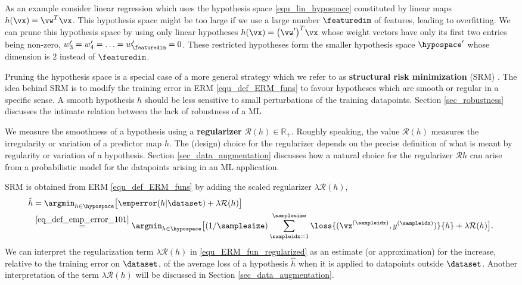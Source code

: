 \documentclass[12pt]{report}
\newcommand{\featurelen}{\featuredim}
\begin{document}
As an example consider linear regression which uses the hypothesis space \eqref{equ_lin_hypospace} 
constituted by linear maps $h(\vx) = \vw^{T} \vx$. This hypothesis space might be 
too large if we use a large number $\featurelen$ of features, leading to overfitting. 
We can prune this hypothesis space by using only linear hypotheses $h(\vx) = \big(\vw'\big)^T \vx$ 
whose weight vectors have only its first two entries being non-zero, $w'_{3} = w_{4}'= \ldots = w_{\featurelen}'=0$. 
These restricted hypotheses form the smaller hypothesis space $\hypospace'$ whose 
dimension is $2$ instead of $\featurelen$. 

Pruning the hypothesis space is a special case of a more general strategy which we  
refer to as {\bf structural risk minimization} (SRM) \cite{VapnikBook}. The idea behind 
SRM is to modify the training error in ERM \eqref{equ_def_ERM_funs} to favour hypotheses 
which are smooth or regular in a specific sense. A smooth hypothesis $h$ should be less 
sensitive to small perturbations of the training datapoints. Section \ref{sec_robustness} discusses 
the intimate relation between the lack of robustness of a ML 

We measure the smoothness of a hypothesis using a {\bf regularizer} $\mathcal{R}(h) \in \mathbb{R}_{+}$. 
Roughly speaking, the value $\mathcal{R}(h)$ measures the irregularity or variation of a predictor map $h$. 
The (design) choice for the regularizer depends on the precise definition of what is meant by regularity 
or variation of a hypothesis. Section \ref{sec_data_augmentation} discusses how a natural choice for the 
regularizer $\mathcal{R}{h}$ can arise from a probabilistic model for the datapoints arising in an ML application. 

SRM is obtained from ERM \eqref{equ_def_ERM_funs} by adding the scaled regularizer $\lambda \mathcal{R}(h)$, 
\begin{align}
\label{equ_ERM_fun_regularized}
\hat{h} & = \argmin_{h \in \hypospace} \big[ \emperror(h|\dataset)  + \lambda \mathcal{R}(h) \big] \nonumber \\
   &   \stackrel{\eqref{eq_def_emp_error_101}}{=}  \argmin_{h \in \hypospace} \big[(1/\samplesize) \sum_{\sampleidx=1}^{\samplesize} \loss{(\vx^{(\sampleidx)},y^{(\sampleidx)})}{h}+ \lambda \mathcal{R}(h)\big]. 
\end{align} 
We can interpret the regularization term $\lambda \mathcal{R}(h)$ in \eqref{equ_ERM_fun_regularized} as an estimate 
(or approximation) for the increase, relative to the training error on $\dataset$, of the average loss of a hypothesis $\hat{h}$ 
when it is applied to datapoints outside $\dataset$. Another interpretation of the term $\lambda \mathcal{R}(h)$ will be 
discussed in Section \ref{sec_data_augmentation}. 
\end{document}
